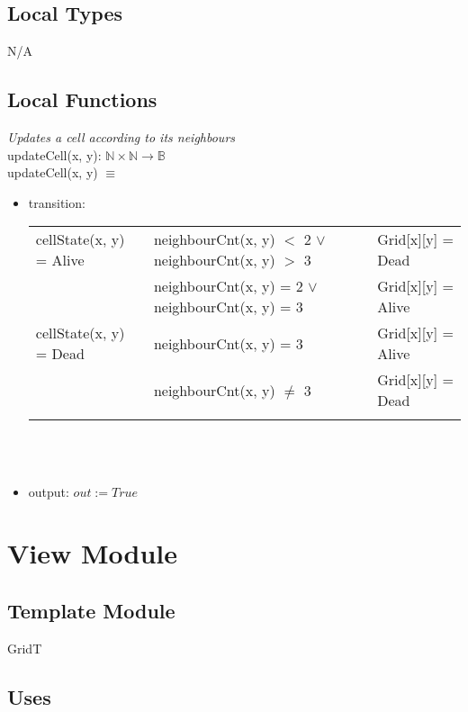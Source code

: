 \documentclass[12pt]{article}
\begin{document}
\subsection*{Local Types}

N/A

\subsection*{Local Functions}

\noindent \textsl{Updates a cell according to its neighbours}\\
\noindent updateCell(x, y): $\mathbb{N} \times \mathbb{N} \rightarrow \mathbb{B}$\\
\noindent updateCell(x, y) $\equiv$
\begin{itemize}
\item transition: \\
\begin{tabular}{|p{4cm}|p{3.5cm}|l|}
\hhline{|-|-|-|}
cellState(x, y) = Alive & neighbourCnt(x, y) $<$ 2 $\lor$ neighbourCnt(x, y) $> $ 3  & Grid[x][y] = Dead \\
\hhline{|~|-|-|}
& neighbourCnt(x, y) = 2 $\lor$ neighbourCnt(x, y) = 3 & Grid[x][y] = Alive \\
\hhline{|-|-|-|}
cellState(x, y) = Dead & neighbourCnt(x, y) = 3 & Grid[x][y] = Alive\\
\hhline{|~|-|-|}
& neighbourCnt(x, y) $\neq$ 3  & Grid[x][y] = Dead \\
\hhline{|-|-|-|}
\end{tabular}\\\\

\item output: $out := True$
\end{itemize}
\newpage

\section* {View Module}

\subsection*{Template Module}

GridT

\subsection* {Uses}
\end{document}
